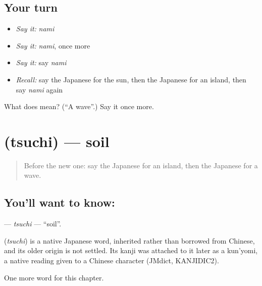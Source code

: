 \subsection*{Your turn}
\begin{itemize}
\raggedright
  \item \emph{Say it:} \emph{nami}
  \item \emph{Say it:} \emph{nami}, once more
  \item \emph{Say it:} say \emph{nami}
  \item \emph{Recall:} say the Japanese for the sun, then the Japanese for an island, then say \emph{nami} again
\end{itemize}

\begin{tcolorbox}[breakable,colback=teal!4,colframe=teal!35!black,title={Before you move on}]
What does  mean? (\textquotedblleft{}A wave\textquotedblright{}.) Say it once more.
\end{tcolorbox}
\section[\texorpdfstring{\ja{つち} (tsuchi)}{つち (tsuchi)}]{ (tsuchi) — soil}

\label{lesson:JA-C44-tsuchi}



\begin{quote}
Before the new one: say the Japanese for an island, then the Japanese for a wave.
\end{quote}

\subsection*{You'll want to know: }
\textbf{} — \emph{tsuchi} — \textquotedblleft{}soil\textquotedblright{}.

\begin{cousinweb}
\textbf{} (\emph{tsuchi}) is a native Japanese word, inherited rather than borrowed from Chinese, and its older origin is not settled. Its kanji was attached to it later as a kun'yomi, a native reading given to a Chinese character (JMdict, KANJIDIC2).
\end{cousinweb}

\begin{grammarlens}[title={What you've built}]
One more word for this chapter.
\end{grammarlens}

